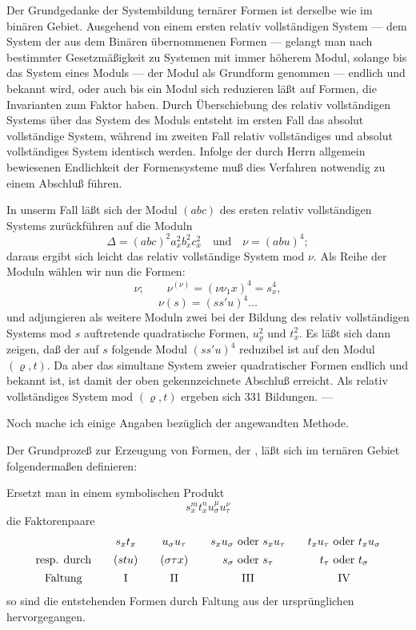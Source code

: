 
Der Grundgedanke der Systembildung ternärer Formen ist derselbe wie im binären Gebiet. Ausgehend von einem ersten relativ vollständigen System --- dem System der aus dem Binären übernommenen Formen --- gelangt man nach bestimmter Gesetzmäßigkeit zu Systemen mit immer höherem Modul, solange bis das System eines Moduls --- der Modul als Grundform genommen --- endlich und bekannt wird, oder auch bis ein Modul sich reduzieren läßt auf Formen, die Invarianten zum Faktor haben. Durch Überschiebung des relativ vollständigen Systems über das System des Moduls entsteht im ersten Fall das absolut vollständige System, während im zweiten Fall relativ vollständiges und absolut vollständiges System identisch werden. Infolge der durch Herrn  allgemein bewiesenen Endlichkeit der Formensysteme muß dies Verfahren notwendig zu einem Abschluß führen.

In unserm Fall läßt sich der Modul $(abc)$ des ersten relativ vollständigen Systems zurückführen auf die Moduln
\[
\Delta=(abc)^2a_x^2b_x^2c_x^2\quad\text{und}\quad \nu=(abu)^4;
\]
daraus ergibt sich leicht das relativ vollständige System mod $\nu$. Als Reihe der Moduln wählen wir nun die Formen:
\[
\nu;\qquad \nu^{(\nu)}=(\nu\nu_1x)^4=s_x^4,
\]
\[
\nu(s)=(ss'u)^4\ldots
\]
und adjungieren als weitere Moduln zwei bei der Bildung des relativ vollständigen Systems mod $s$ auftretende quadratische Formen, $u_\varrho^2$ und $t_x^2$. Es läßt sich dann zeigen, daß der auf $s$ folgende Modul $(ss'u)^4$ reduzibel ist auf den Modul $(\varrho,t)$. Da aber das simultane System zweier quadratischer Formen endlich und bekannt ist, ist damit der oben gekennzeichnete Abschluß erreicht. Als relativ vollständiges System mod $(\varrho,t)$ ergeben sich 331 Bildungen. ---

Noch mache ich einige Angaben bezüglich der angewandten Methode.

Der Grundprozeß zur Erzeugung von Formen, der , läßt sich im ternären Gebiet folgendermaßen definieren:

Ersetzt man in einem symbolischen Produkt
\[
s_x^m t_x^n u_\sigma^\mu u_\tau^\nu
\]
die Faktorenpaare
\[
\begin{array}{@{}c@{\qquad}c@{\qquad}c@{\qquad}c@{\qquad}c@{}}
 & s_xt_x & u_\sigma u_\tau & s_xu_\sigma\ \text{oder}\ s_xu_\tau & t_xu_\tau\ \text{oder}\ t_xu_\sigma\\[0.45em]
\text{resp. durch} & (stu) & (\sigma\tau x) & s_\sigma\ \text{oder}\ s_\tau & t_\tau\ \text{oder}\ t_\sigma\\[0.45em]
\text{Faltung} & \mathrm{I} & \mathrm{II} & \mathrm{III} & \mathrm{IV}
\end{array}
\]
so sind die entstehenden Formen durch Faltung aus der ursprünglichen hervorgegangen.

